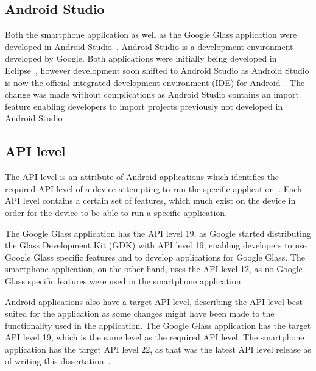 

\subsection{Android Studio}
Both the smartphone application as well as the Google Glass application were developed in Android Studio~\cite{androidStudio}. Android Studio is a development environment developed by Google. Both applications were initially being developed in Eclipse~\cite{eclipse}, however development soon shifted to Android Studio as Android Studio is now the official integrated development environment (IDE) for Android~\cite{androidIDE}. The change was made without complications as Android Studio contains an import feature enabling developers to import projects previously not developed in Android Studio~\cite{androidIDE}.

\subsection{API level}
The API level is an attribute of Android applications which identifies the required API level of a device attempting to run the specific application~\cite{androidAPI}. Each API level contains a certain set of features, which much exist on the device in order for the device to be able to run a specific application.

The Google Glass application has the API level 19, as Google started distributing the Glass Development Kit (GDK) with API level 19, enabling developers to use Google Glass specific features and to develop applications for Google Glass. The smartphone application, on the other hand, uses the API level 12, as no Google Glass specific features were used in the smartphone application.

Android applications also have a target API level, describing the API level best suited for the application as some changes might have been made to the functionality used in the application. The Google Glass application has the target API level 19, which is the same level as the required API level. The smartphone application has the target API level 22, as that was the latest API level release as of writing this dissertation~\cite{api22}.



